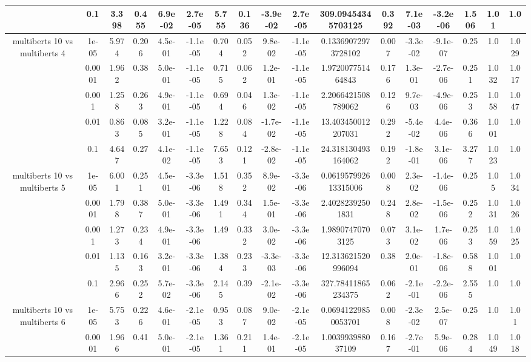 \begin{tabular}{|c|c|c|c|c|c|c|c|c|c|c|c|c|c|c|c|c|}
 & 0.1 & 3.398 & 0.455 & 6.9e-02 & 2.7e-05 & 5.755 & 0.136 & -3.9e-02 & 2.7e-05 & 309.09454345703125 & 0.392 & 7.1e-03 & -3.2e-06 & 1.506 & 1.01 & 1.0 \\
\hline
\multirow{5}{*}{multiberts 10 vs multiberts 4} & 1e-05 & 5.974 & 0.206 & 4.5e-01 & -1.1e-05 & 0.704 & 0.052 & 9.8e-02 & -1.1e-05 & 0.13369072973728102 & 0.007 & -3.3e-02 & -9.1e-07 & 0.25 & 1.0 & 1.029 \\
 & 0.0001 & 1.962 & 0.38 & 5.0e-01 & -1.1e-05 & 0.715 & 0.062 & 1.2e-01 & -1.1e-05 & 1.972007751464843 & 0.176 & 1.3e-01 & -2.7e-06 & 0.251 & 1.032 & 1.017 \\
 & 0.001 & 1.258 & 0.263 & 4.9e-01 & -1.1e-05 & 0.694 & 0.046 & 1.3e-02 & -1.1e-05 & 2.2066421508789062 & 0.126 & 9.7e-03 & -4.9e-06 & 0.253 & 1.058 & 1.047 \\
 & 0.01 & 0.863 & 0.085 & 3.2e-01 & -1.1e-05 & 1.228 & 0.084 & -1.7e-02 & -1.1e-05 & 13.403450012207031 & 0.292 & -5.4e-02 & 4.4e-06 & 0.366 & 1.001 & 1.0 \\
 & 0.1 & 4.647 & 0.27 & 4.1e-02 & -1.1e-05 & 7.653 & 0.121 & -2.8e-02 & -1.1e-05 & 24.318130493164062 & 0.192 & -1.8e-01 & 3.1e-06 & 3.277 & 1.023 & 1.0 \\
\hline
\multirow{5}{*}{multiberts 10 vs multiberts 5} & 1e-05 & 6.001 & 0.251 & 4.5e-01 & -3.3e-06 & 1.518 & 0.352 & 8.9e-02 & -3.3e-06 & 0.061957992613315006 & 0.008 & 2.3e-02 & -1.4e-06 & 0.25 & 1.05 & 1.034 \\
 & 0.0001 & 1.798 & 0.387 & 5.0e-01 & -3.3e-06 & 1.491 & 0.344 & 1.5e-01 & -3.3e-06 & 2.40282392501831 & 0.248 & 2.8e-02 & -1.5e-06 & 0.252 & 1.031 & 1.026 \\
 & 0.001 & 1.273 & 0.234 & 4.9e-01 & -3.3e-06 & 1.49 & 0.332 & 3.0e-02 & -3.3e-06 & 1.98907470703125 & 0.073 & 3.1e-02 & 1.7e-06 & 0.253 & 1.059 & 1.025 \\
 & 0.01 & 1.135 & 0.163 & 3.2e-01 & -3.3e-06 & 1.384 & 0.233 & -3.3e-03 & -3.3e-06 & 12.313621520996094 & 0.38 & 2.0e-01 & -1.8e-06 & 0.588 & 1.001 & 1.0 \\
 & 0.1 & 2.966 & 0.252 & 5.7e-02 & -3.3e-06 & 2.145 & 0.39 & -2.1e-02 & -3.3e-06 & 327.78411865234375 & 0.062 & -2.1e-01 & -2.2e-06 & 2.555 & 1.0 & 1.0 \\
\hline
\multirow{5}{*}{multiberts 10 vs multiberts 6} & 1e-05 & 5.753 & 0.226 & 4.6e-01 & -2.1e-05 & 0.953 & 0.087 & 9.0e-02 & -2.1e-05 & 0.06941229850053701 & 0.008 & -2.3e-02 & 2.5e-07 & 0.25 & 1.0 & 1.01 \\
 & 0.0001 & 1.966 & 0.41 & 5.0e-01 & -2.1e-05 & 1.361 & 0.211 & 1.4e-01 & -2.1e-05 & 1.003993988037109 & 0.167 & -2.7e-01 & 5.9e-06 & 0.284 & 1.049 & 1.018 \\

\end{tabular}
